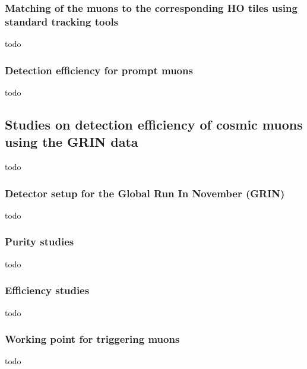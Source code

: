 		\subsubsection{Matching of the muons to the corresponding HO tiles using standard tracking tools}
			todo
		\subsubsection{Detection efficiency for prompt muons}
			todo
	\subsection{Studies on detection efficiency of cosmic muons using the GRIN data} 
		todo
		\subsubsection{Detector setup for the Global Run In November (GRIN)}
			todo
		\subsubsection{Purity studies}
			todo
		\subsubsection{Efficiency studies}
			todo
		\subsubsection{Working point for triggering muons}
			todo
